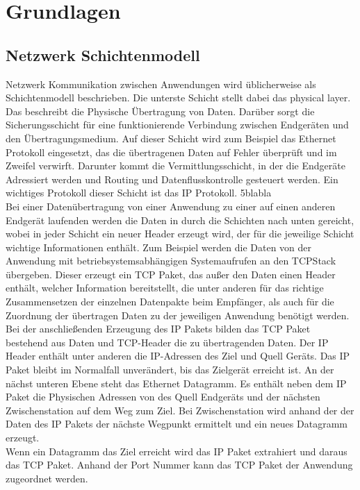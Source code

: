 \chapter{Grundlagen}

\section{Netzwerk Schichtenmodell}
Netzwerk Kommunikation zwischen Anwendungen wird üblicherweise als Schichtenmodell beschrieben.  
Die unterste Schicht stellt dabei das physical layer. Das beschreibt die Physische Übertragung von Daten. 
Darüber sorgt die Sicherungsschicht für eine funktionierende Verbindung zwischen Endgeräten und den Übertragungsmedium. Auf dieser Schicht wird zum Beispiel das Ethernet Protokoll eingesetzt, das die übertragenen Daten auf Fehler überprüft und im Zweifel verwirft. 
Darunter kommt die Vermittlungsschicht, in der die Endgeräte Adressiert werden und Routing und Datenflusskontrolle gesteuert werden. Ein wichtiges Protokoll dieser Schicht ist das IP Protokoll.
5blabla \\

Bei einer Datenübertragung von einer Anwendung zu einer auf einen anderen Endgerät laufenden werden die Daten in durch die Schichten nach unten gereicht, wobei in jeder Schicht ein neuer Header erzeugt wird, der für die jeweilige Schicht wichtige Informationen enthält. Zum Beispiel werden die Daten von der Anwendung mit betriebsystemsabhängigen Systemaufrufen an den TCPStack übergeben. Dieser erzeugt ein TCP Paket, das außer den Daten einen Header enthält, welcher Information bereitstellt, die unter anderen für das richtige Zusammensetzen der einzelnen Datenpakte beim Empfänger, als auch für die Zuordnung der übertragen Daten zu der jeweiligen Anwendung benötigt werden. Bei der anschließenden Erzeugung des IP Pakets bilden das TCP Paket bestehend aus Daten und TCP-Header die zu übertragenden Daten. Der IP Header enthält unter anderen die IP-Adressen des Ziel und Quell Geräts. Das IP Paket bleibt im Normalfall unverändert, bis das Zielgerät erreicht ist. An der nächst unteren Ebene steht das Ethernet Datagramm. Es enthält neben dem IP Paket die Physischen Adressen von des Quell Endgeräts und der nächsten Zwischenstation auf dem Weg zum Ziel. Bei Zwischenstation wird anhand der der Daten des IP Pakets der nächste Wegpunkt ermittelt und ein neues Datagramm erzeugt. \\
Wenn ein Datagramm das Ziel erreicht wird das IP Paket extrahiert und daraus das TCP Paket. Anhand der Port Nummer kann das TCP Paket der Anwendung zugeordnet werden.



